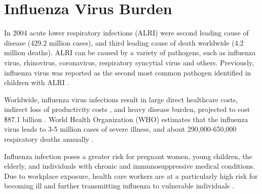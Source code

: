 \section{Influenza Virus Burden}

In 2004 acute lower respiratory infections (ALRI) were second leading cause of disease (429.2 million cases), and third leading cause of death worldwide \cite{world2008global} (4.2 million deaths). ALRI can be caused by a variety of pathogens, such as influenza virus, rhinovirus, coronavirus, respiratory syncytial virus and others. Previously, influenza virus was reported as the second most common pathogen identified in children with ALRI \cite{nair2011global}.

Worldwide, influenza virus infections result in large direct healthcare costs, indirect loss of productivity costs \cite{de2015systematic}, and heavy disease burden, projected to cost \$87.1 billion \cite{molinari2007annual}. World Health Organization (WHO) estimates that the influenza virus leads to 3-5 million cases of severe illness, and about 290,000-650,000 respiratory deaths annually \cite{influenza_seasonal_2018}.

Influenza infection poses a greater risk for pregnant women, young children, the elderly, and individuals with chronic and immunosuppressive medical conditions. Due to workplace exposure, health care workers are at a particularly high risk for becoming ill and further transmitting influenza to vulnerable individuals \cite{influenza_seasonal_2018}.